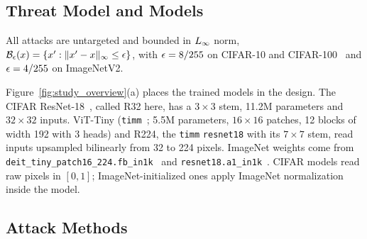 \subsection{Threat Model and Models}
\label{subsec:setup}

All attacks are untargeted and bounded in $L_\infty$ norm, $\mathcal{B}_\epsilon(x) = \{x' : \|x' - x\|_\infty \leq \epsilon\}$, with $\epsilon = 8/255$ on CIFAR-10 and CIFAR-100~\cite{krizhevsky2009learning} and $\epsilon = 4/255$ on ImageNetV2.

Figure~\ref{fig:study_overview}(a) places the trained models in the design. The CIFAR ResNet-18~\cite{he2016deep}, called R32 here, has a $3\times3$ stem, 11.2M parameters and $32\times32$ inputs. ViT-Tiny (\texttt{timm}~\cite{rw2019timm}; 5.5M parameters, $16\times16$ patches, 12 blocks of width 192 with 3 heads) and R224, the \texttt{timm} \texttt{resnet18} with its $7\times7$ stem, read inputs upsampled bilinearly from 32 to 224 pixels. ImageNet weights come from \texttt{deit\_tiny\_patch16\_224.fb\_in1k}~\cite{touvron2021training} and \texttt{resnet18.a1\_in1k}~\cite{wightman2021resnet}. CIFAR models read raw pixels in $[0,1]$; ImageNet-initialized ones apply ImageNet normalization inside the model.

\subsection{Attack Methods}
\label{subsec:attack_methods}

